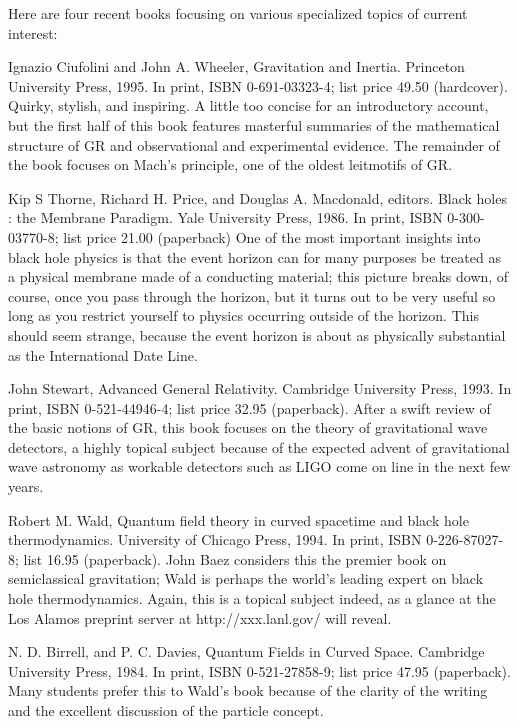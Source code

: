 \documentclass[10pt,a4paper]{book}
\theoremstyle{definition}
\begin{document}
Here are four recent books focusing on various specialized topics of current interest:

Ignazio Ciufolini and John A. Wheeler,
Gravitation and Inertia.
Princeton University Press, 1995.
In print, ISBN 0-691-03323-4; list price 49.50 (hardcover).
Quirky, stylish, and inspiring.  A little too concise for an introductory account, but the first half of this book features masterful summaries of the mathematical structure of GR and observational and experimental evidence.  The remainder of the book focuses on Mach's principle, one of the oldest leitmotifs of GR.

Kip S Thorne, Richard H. Price, and Douglas A. Macdonald, editors. Black holes : the Membrane Paradigm.
Yale University Press, 1986.
In print, ISBN 0-300-03770-8; list price 21.00 (paperback)
One of the most important insights into black hole physics is that the event horizon can for many purposes be treated as a physical membrane made of a conducting material; this picture breaks down, of course, once you pass through the horizon, but it turns out to be very useful so long as you restrict yourself to physics occurring outside of the horizon.  This should seem strange, because the event horizon is about as physically substantial as the International Date Line.

John Stewart,
Advanced General Relativity.
Cambridge University Press, 1993.
In print, ISBN 0-521-44946-4; list price 32.95 (paperback).
After a swift review of the basic notions of GR, this book focuses on the theory of gravitational wave detectors, a highly topical subject because of the expected advent of gravitational wave astronomy as workable detectors such as LIGO come on line in the next few years.

Robert M. Wald,
Quantum field theory in curved spacetime and black hole thermodynamics.
University of Chicago Press, 1994.
In print, ISBN 0-226-87027-8; list 16.95 (paperback).
John Baez considers this the premier book on semiclassical gravitation; Wald is perhaps the world's leading expert on black hole thermodynamics.  Again, this is a topical subject indeed, as a glance at the Los Alamos preprint server at http://xxx.lanl.gov/ will reveal.

N. D. Birrell, and P. C. Davies,
Quantum Fields in Curved Space.
Cambridge University Press, 1984.
In print, ISBN 0-521-27858-9; list price 47.95 (paperback).
Many students prefer this to Wald's book because of the clarity of the writing and the excellent discussion of the particle concept.
\end{document}
